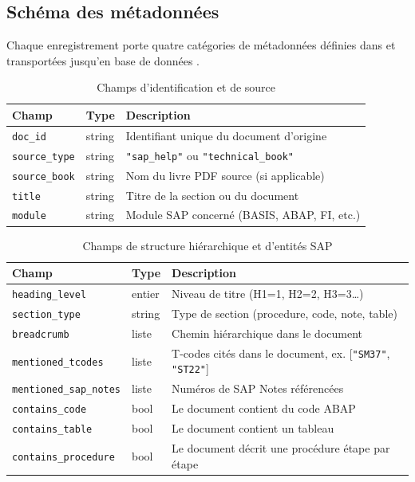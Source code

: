 \subsection{Schéma des métadonnées}

Chaque enregistrement porte quatre catégories de métadonnées définies dans
 et transportées jusqu'en base de données .

\begin{table}[H]
\centering
\caption{Champs d'identification et de source}
\label{tab:meta-source}
\begin{tabularx}{\textwidth}{@{}llX@{}}
\toprule
\textbf{Champ} & \textbf{Type} & \textbf{Description} \\
\midrule
\texttt{doc\_id}      & string & Identifiant unique du document d'origine \\
\texttt{source\_type} & string & \texttt{"sap\_help"} ou \texttt{"technical\_book"} \\
\texttt{source\_book} & string & Nom du livre PDF source (si applicable) \\
\texttt{title}        & string & Titre de la section ou du document \\
\texttt{module}       & string & Module SAP concerné (BASIS, ABAP, FI, etc.) \\
\bottomrule
\end{tabularx}
\end{table}

\begin{table}[H]
\centering
\caption{Champs de structure hiérarchique et d'entités SAP}
\label{tab:meta-structure}
\begin{tabularx}{\textwidth}{@{}llX@{}}
\toprule
\textbf{Champ} & \textbf{Type} & \textbf{Description} \\
\midrule
\texttt{heading\_level}      & entier & Niveau de titre (H1=1, H2=2, H3=3…) \\
\texttt{section\_type}       & string & Type de section (procedure, code, note, table) \\
\texttt{breadcrumb}          & liste  & Chemin hiérarchique dans le document \\
\texttt{mentioned\_tcodes}   & liste  & T-codes cités dans le document, ex. [\texttt{"SM37"}, \texttt{"ST22"}] \\
\texttt{mentioned\_sap\_notes} & liste & Numéros de SAP Notes référencées \\
\texttt{contains\_code}      & bool   & Le document contient du code ABAP \\
\texttt{contains\_table}     & bool   & Le document contient un tableau \\
\texttt{contains\_procedure} & bool   & Le document décrit une procédure étape par étape \\
\bottomrule
\end{tabularx}
\end{table}

